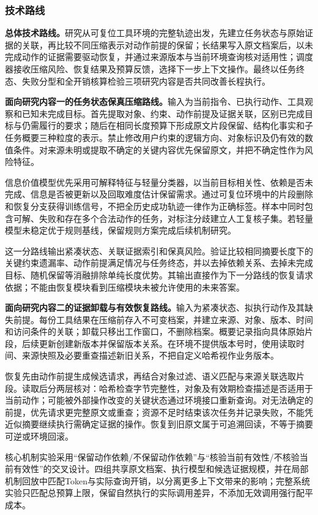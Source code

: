 \subsubsection{技术路线}
\textbf{总体技术路线。}研究从可复位工具环境的完整轨迹出发，先建立任务状态与原始证据的关联，再比较不同压缩表示对动作前提的保留；长结果写入原文档案后，以未完成动作的证据需要驱动恢复，并通过来源版本与当前环境查询核对适用性；调度器接收压缩风险、恢复结果及预算反馈，选择下一步上下文操作。最终以任务终态、失败分型和全开销核算检验三项研究内容是否共同改善长程执行。

\textbf{面向研究内容一的任务状态保真压缩路线。}输入为当前指令、已执行动作、工具观察和已知未完成目标。首先提取对象、约束、动作前提及证据关联，区别已完成目标与仍需履行的要求；随后在相同长度预算下形成原文片段保留、结构化事实和子任务概要三种粒度的表示。禁止修改用户约束的逻辑方向、对象标识及仍有效的数值条件。对来源未明或提取不确定的关键内容优先保留原文，并把不确定性作为风险特征。

信息价值模型优先采用可解释特征与轻量分类器，以当前目标相关性、依赖是否未完成、信息是否被更新以及回取难度估计保留需求。通过可复位环境中的片段删除和恢复分支获得训练信号，不把全历史成功轨迹一律作为正确标签。样本中同时包含可解、失败和存在多个合法动作的任务，对标注分歧建立人工复核子集。若轻量模型未稳定优于规则基线，保留规则方案完成后续机制研究。

这一分路线输出紧凑状态、关联证据索引和保真风险。验证比较相同摘要长度下的关键约束遗漏率、动作前提满足情况与任务终态，并以去掉依赖关系、去掉未完成目标、随机保留等消融排除单纯长度优势。其输出直接作为下一分路线的恢复请求依据；不能由恢复模块看到压缩模块未被允许使用的未来答案。

\textbf{面向研究内容二的证据卸载与有效恢复路线。}输入为紧凑状态、拟执行动作及其缺失前提。每份工具结果在压缩前存入不可变档案，并建立来源、对象、版本、时间和访问条件的关联；卸载只移出工作窗口，不删除档案。概要记录指向具体原始片段，后续更新创建新版本并保留版本关系。在环境不提供版本号时，使用读取时间、来源快照及必要重查描述新旧关系，不把自定义哈希视作业务版本。

恢复先由动作前提生成候选请求，再结合对象过滤、语义匹配与来源关联选取片段。读取后分两层核对：哈希检查字节完整性，对象及有效期检查描述是否适用于当前动作；可能被外部操作改变的关键状态通过环境接口重新查询。对无法确定的前提，优先请求更完整原文或重查；资源不足时结束该次任务并记录失败，不能凭近似摘要继续执行需确定证据的操作。恢复到旧原文属于可追溯回读，不等于摘要可逆或环境回滚。

核心机制实验采用“保留动作依赖/不保留动作依赖”与“核验当前有效性/不核验当前有效性”的交叉设计。四组共享原文档案、执行模型和候选证据规模，并在局部机制回放中匹配Token与实际查询开销，以分离更多上下文带来的影响；完整系统实验只匹配总预算上限，保留自然执行的实际调用差异，不添加无效调用强行配平成本。

